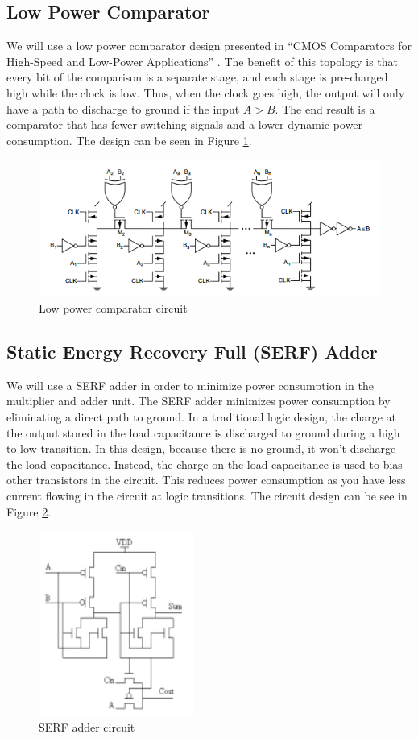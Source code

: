 \documentclass{memo}
\begin{document}
\subsection{Low Power Comparator}
We will use a low power comparator design presented in ``CMOS Comparators for High-Speed and Low-Power Applications'' \cite{menendez}. The benefit of this topology is that every bit of the comparison is a separate stage, and each stage is pre-charged high while the clock is low. Thus, when the clock goes high, the output will only have a path to discharge to ground if the input $A > B$. The end result is a comparator that has fewer switching signals and a lower dynamic power consumption. The design can be seen in Figure \ref{fig:low-power-comparator}.
\begin{figure}[h]
    \centering
    \includegraphics{low-power-comparator.png}
    \caption{Low power comparator circuit \cite{menendez}}
    \label{fig:low-power-comparator}
\end{figure}

\subsection{Static Energy Recovery Full (SERF) Adder }
We will use a SERF adder in order to minimize power consumption in the multiplier and adder unit. The SERF adder minimizes power consumption by eliminating a direct path to ground. In a traditional logic design, the charge at the output stored in the load capacitance is discharged to ground during a high to low transition. In this design, because there is no ground, it won't discharge the load capacitance. Instead, the charge on the load capacitance is used to bias other transistors in the circuit. This reduces power consumption as you have less current flowing in the circuit at logic transitions. The circuit design can be see in Figure \ref{fig:serf-adder-design}.
\begin{figure}[h]
    \centering
    \includegraphics{serf-adder.png}
    \caption{SERF adder circuit \cite{shalem}}
    \label{fig:serf-adder-design}
\end{figure}
\end{document}
